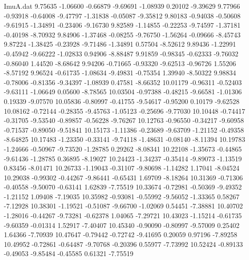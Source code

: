 \begin{filecontents}{ImuA.dat}
   9.75635   -1.06600   -0.66879   -9.69691   -1.08939    0.20102   -9.39629
   9.77966   -0.93918   -0.64008   -9.47797   -1.31838   -0.05087   -9.35812
   9.80183   -0.94038   -0.50608   -9.61915   -1.34891   -0.23406   -9.16730
   9.82589   -1.14855   -0.22253   -9.74597   -1.37181   -0.40198   -8.70932
   9.84906   -1.37468   -0.08255   -9.76750   -1.56264   -0.09666   -8.45743
   9.87224   -1.38425   -0.23928   -9.71486   -1.34891    0.57504   -8.52612
   9.89436   -1.22991   -0.45942   -9.66222   -1.02833    0.94906   -8.88487
   9.91859   -0.98345   -0.62333   -9.76032   -0.86040    1.44520   -8.68642
   9.94206   -0.71665   -0.93320   -9.62513   -0.96726    1.55206   -8.57192
   9.96524   -0.61735   -1.08634   -9.49831   -0.75354    1.39940   -8.50322
   9.98834   -0.78006   -0.81356   -9.34397   -1.08939    0.47581   -8.66352
  10.01179   -0.96311   -0.52403   -9.63111   -1.06649    0.05600   -8.78565
  10.03504   -0.97388   -0.48215   -9.66581   -1.01306    0.19339   -9.07570
  10.05836   -0.80997   -0.41755   -9.54617   -0.95200    0.10179   -9.62528
  10.08162   -0.72144   -0.28355   -9.45763   -1.05123   -0.25696   -9.77030
  10.10448   -0.74417   -0.31705   -9.53540   -0.89857   -0.56228   -9.76267
  10.12763   -0.96550   -0.34217   -9.60958   -0.71537   -0.89050   -9.51841
  10.15173   -1.11386   -0.23689   -9.63709   -1.21152   -0.49358   -8.64825
  10.17483   -1.23350   -0.33141   -9.74118   -1.48631   -0.08140   -8.11394
  10.19783   -1.24666   -0.50967   -9.73520   -1.28785    0.29262   -8.08341
  10.22108   -1.35673   -0.44865   -9.61436   -1.28785    0.36895   -8.19027
  10.24423   -1.34237   -0.35414   -9.89073   -1.13519    0.83456   -8.01471
  10.26733   -1.19043   -0.31107   -9.80698   -1.14282    1.17041   -8.04524
  10.29038   -0.99302   -0.44267   -9.86441   -0.65431    1.69709   -8.18264
  10.31369   -0.71306   -0.40558   -9.50070   -0.63141    1.62839   -7.75519
  10.33674   -0.72981   -0.50369   -9.49352   -1.21152    1.09408   -7.19035
  10.35982   -0.93081   -0.55992   -9.56052   -1.33365    0.58267   -7.12928
  10.38301   -1.19521   -0.51087   -9.66700   -1.02069    0.54451   -7.38881
  10.40702   -1.28016   -0.44267   -9.73281   -0.62378    1.04065   -7.29721
  10.43023   -1.15214   -0.61735   -9.60359   -0.01314    1.52917   -7.40407
  10.45340   -0.90090   -0.80997   -9.57009    0.25402    1.64366   -7.70939
  10.47647   -0.79442   -0.72742   -9.41695    0.20059    0.97196   -7.89258
  10.49952   -0.72861   -0.64487   -9.70768   -0.20396    0.55977   -7.73992
  10.52424   -0.89133   -0.49053   -9.85484   -0.45585    0.61321   -7.75519

\end{filecontents}
